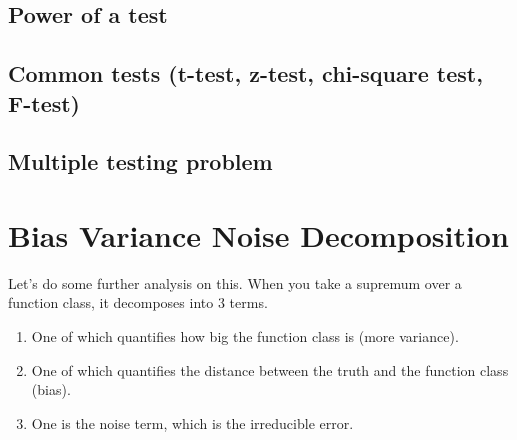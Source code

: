 \documentclass{article}
\begin{document}
  \subsection{Power of a test}

  \subsection{Common tests (t-test, z-test, chi-square test, F-test)}

  \subsection{Multiple testing problem}

\section{Bias Variance Noise Decomposition} 

  Let's do some further analysis on this. When you take a supremum over a function class, it decomposes into 3 terms. 
  \begin{enumerate}
    \item One of which quantifies how big the function class is (more variance). 
    \item One of which quantifies the distance between the truth and the function class (bias).  
    \item One is the noise term, which is the irreducible error. 
  \end{enumerate}
\end{document}
